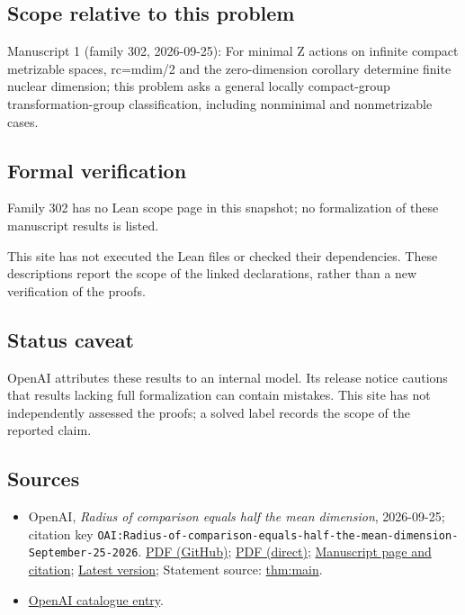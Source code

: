 \documentclass[11pt]{article}
\begin{document}
\subsection{Scope relative to this problem}
Manuscript 1 (family 302, 2026-09-25): For minimal Z actions on infinite compact metrizable spaces, rc=mdim/2 and the zero-dimension corollary determine finite nuclear dimension; this problem asks a general locally compact-group transformation-group classification, including nonminimal and nonmetrizable cases.

\subsection{Formal verification}
Family 302 has no Lean scope page in this snapshot; no formalization of these manuscript results is listed.

This site has not executed the Lean files or checked their dependencies. These descriptions report the scope of the linked declarations, rather than a new verification of the proofs.

\subsection{Status caveat}
OpenAI attributes these results to an internal model. Its release notice cautions that results lacking full formalization can contain mistakes. This site has not independently assessed the proofs; a solved label records the scope of the reported claim.

\subsection{Sources}
\begin{itemize}
\item OpenAI, \emph{Radius of comparison equals half the mean dimension}, 2026-09-25; citation key \texttt{OAI:Radius-of-comparison-equals-half-the-mean-dimension-September-25-2026}. \href{https://github.com/openai/math/blob/adc7f1241b42e322a6451854ab7e4b4c146bf78a/preprints/Radius-of-comparison-equals-half-the-mean-dimension-September-25-2026/paper.pdf}{PDF (GitHub)}; \href{https://github.com/openai/math/raw/adc7f1241b42e322a6451854ab7e4b4c146bf78a/preprints/Radius-of-comparison-equals-half-the-mean-dimension-September-25-2026/paper.pdf}{PDF (direct)}; \href{https://github.com/openai/math/blob/adc7f1241b42e322a6451854ab7e4b4c146bf78a/preprints/Radius-of-comparison-equals-half-the-mean-dimension-September-25-2026/README.md}{Manuscript page and citation}; \href{https://github.com/openai/math/blob/main/preprints/Radius-of-comparison-equals-half-the-mean-dimension-September-25-2026/paper.pdf}{Latest version}; Statement source: \href{https://github.com/openai/math/blob/adc7f1241b42e322a6451854ab7e4b4c146bf78a/preprints/Radius-of-comparison-equals-half-the-mean-dimension-September-25-2026/build/sections/01-introduction.tex\#L51}{thm:main}.
\item \href{https://github.com/openai/math/blob/adc7f1241b42e322a6451854ab7e4b4c146bf78a/CONTENTS.md}{OpenAI catalogue entry}.
\end{itemize}
\end{document}
